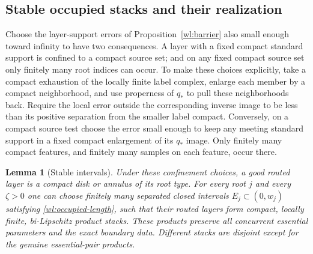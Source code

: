 \documentclass[11pt]{article}
\numberwithin{equation}{section}
\newtheorem{lemma}[theorem]{Lemma}
\theoremstyle{definition}
\theoremstyle{remark}
\begin{document}
\subsection{Stable occupied stacks and their realization}

Choose the layer-support errors of Proposition~\ref{wl:barrier} also
small enough toward infinity to have two consequences.  A layer
with a fixed compact standard support is confined to a compact
source set; and on any fixed compact source set only finitely many
root indices can occur.  To make these choices explicitly, take a
compact exhaustion of the locally finite label complex, enlarge
each member by a compact neighborhood, and use properness of $q_*$
to pull these neighborhoods back.  Require the local error outside
the corresponding inverse image to be less than its positive
separation from the smaller label compact.  Conversely, on a compact
source test choose the error small enough to keep any meeting
standard support in a fixed compact enlargement of its $q_*$ image.
Only finitely many compact features, and finitely many samples on
each feature, occur there.

\begin{lemma}[Stable intervals]\label{wl:stable}
Under these confinement choices, a good routed layer is a compact
disk or annulus of its root type.  For every root $j$ and every
$\zeta>0$ one can choose finitely many separated closed intervals
$E_j\subset(0,w_j)$ satisfying \eqref{wl:occupied-length}, such that
their routed layers form compact, locally finite, bi-Lipschitz
product stacks.  These products preserve all concurrent essential
parameters and the exact boundary data.  Different stacks are
disjoint except for the genuine essential-pair products.
\end{lemma}
\end{document}
